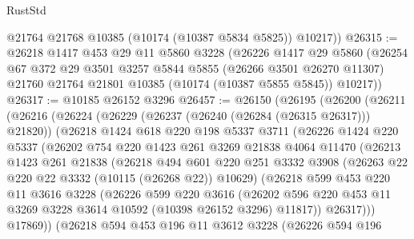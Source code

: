 \begin{lexlean}{RustStd}
\begin{coremodule}
        @21764
        @21768
        @10385
        (@10174 (@10387 @5834 @5825))
        @10217))
@26315 := @26218
    @1417
    @453
    @29
    @11
    @5860
    @3228
    (@26226
      @1417
      @29
      @5860
      (@26254
        @67
        @372
        @29
        @3501
        @3257
        @5844
        @5855
        (@26266 @3501 @26270 @11307)
        @21760
        @21764
        @21801
        @10385
        (@10174 (@10387 @5855 @5845))
        @10217))
@26317 := @10185 @26152 @3296
@26457 := @26150
    (@26195
      (@26200
        (@26211
          (@26216
            (@26224
              (@26229 (@26237 (@26240 (@26284 (@26315 @26317))) @21820))
              (@26218
                @1424
                @618
                @220
                @198
                @5337
                @3711
                (@26226
                  @1424
                  @220
                  @5337
                  (@26202
                    @754
                    @220
                    @1423
                    @261
                    @3269
                    @21838
                    @4064
                    @11470
                    (@26213
                      @1423
                      @261
                      @21838
                      (@26218
                        @494
                        @601
                        @220
                        @251
                        @3332
                        @3908
                        (@26263 @22 @220 @22 @3332 (@10115 (@26268 @22)) @10629)
                        (@26218
                          @599
                          @453
                          @220
                          @11
                          @3616
                          @3228
                          (@26226
                            @599
                            @220
                            @3616
                            (@26202
                              @596
                              @220
                              @453
                              @11
                              @3269
                              @3228
                              @3614
                              @10592
                              (@10398 @26152 @3296)
                              @11817))
                          @26317)))
                    @17869))
                (@26218
                  @594
                  @453
                  @196
                  @11
                  @3612
                  @3228
                  (@26226
                    @594
                    @196

\end{coremodule}
\end{lexlean}
